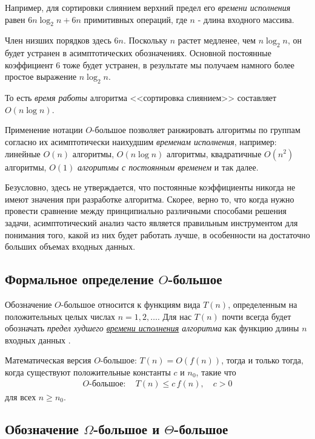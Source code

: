 \documentclass[%
	11pt,
	a4paper,
	utf8,
		]{article}
\begin{document}
Например, для сортировки слиянием верхний предел его \emph{времени исполнения} равен $ 6 n \log_2 n + 6 n $ примитивных операций, где $ n $ - длина входного массива.

Член низших порядков здесь $ 6 n $. Поскольку $ n $ растет медленее, чем $ n \log_2 n $, он будет устранен в асимптотических обозначениях. Основной постоянные коэффициент 6 тоже будет устранен, в результате мы получаем намного более простое выражение $ n \log_2 n $. 

То есть \emph{время работы} алгоритма <<сортировка слиянием>> составляет $ O(n \log n) $.

Применение нотации $ O $-большое позволяет ранжировать алгоритмы по группам согласно их асимптотически наихудшим \emph{временам исполнения}, например: линейные $ O(n) $ алгоритмы, $ O(n \log n) $ алгоритмы, квадратичные $ O(n^2) $ алгоритмы, $ O(1) $ \emph{алгоритмы с постоянным временем} и так далее.

Безусловно, здесь не утверждается, что постоянные коэффициенты никогда не имеют значения при разработке алгоритма. Скорее, верно то, что когда нужно провести сравнение между принципиально различными способами решения задачи, асимптотический анализ часто является правильным инструментом для понимания того, какой из них будет работать лучше, в особенности на достаточно больших объемах входных данных.

\subsection{Формальное определение $ O $-большое}

Обозначение $ O $-большое относится к функциям вида $ T(n) $, определенным на положительных целых числах $ n = 1, 2, \dots $. Для нас $ T(n) $ почти всегда будет обозначать \emph{предел худшего \underline{времени исполнения} алгоритма} как функцию длины $ n $ входных данных \cite[74]{roughgarden:2019}.

Математическая версия $ O $-большое: $ T(n) = O(f(n)) $, тогда и только тогда, когда существуют положительные константы $ c $ и $ n_0 $, такие что
\begin{align*}
	O\textit{-большое}:\quad T(n) \leqslant c\,f(n), \quad c > 0
\end{align*}
для всех $ n \geqslant n_0 $.

\subsection{Обозначение $ \Omega $-большое и $ \Theta $-большое}
\end{document}
